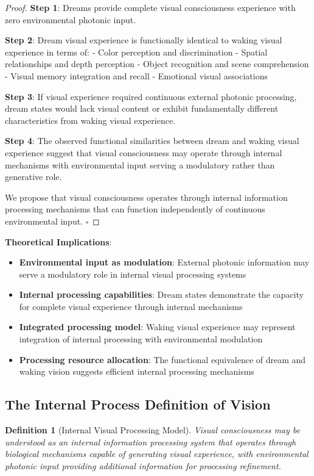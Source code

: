 \documentclass[12pt,a4paper]{article}
\newtheorem{definition}[theorem]{Definition}
\begin{document}
\begin{proof}
\textbf{Step 1}: Dreams provide complete visual consciousness experience with zero environmental photonic input.

\textbf{Step 2}: Dream visual experience is functionally identical to waking visual experience in terms of:
- Color perception and discrimination
- Spatial relationships and depth perception  
- Object recognition and scene comprehension
- Visual memory integration and recall
- Emotional visual associations

\textbf{Step 3}: If visual experience required continuous external photonic processing, dream states would lack visual content or exhibit fundamentally different characteristics from waking visual experience.

\textbf{Step 4}: The observed functional similarities between dream and waking visual experience suggest that visual consciousness may operate through internal mechanisms with environmental input serving a modulatory rather than generative role.

We propose that visual consciousness operates through internal information processing mechanisms that can function independently of continuous environmental input. $\square$
\end{proof}

\textbf{Theoretical Implications}:
\begin{itemize}
\item \textbf{Environmental input as modulation}: External photonic information may serve a modulatory role in internal visual processing systems
\item \textbf{Internal processing capabilities}: Dream states demonstrate the capacity for complete visual experience through internal mechanisms
\item \textbf{Integrated processing model}: Waking visual experience may represent integration of internal processing with environmental modulation
\item \textbf{Processing resource allocation}: The functional equivalence of dream and waking vision suggests efficient internal processing mechanisms
\end{itemize}

\subsection{The Internal Process Definition of Vision}

\begin{definition}[Internal Visual Processing Model]
Visual consciousness may be understood as an internal information processing system that operates through biological mechanisms capable of generating visual experience, with environmental photonic input providing additional information for processing refinement.
\end{definition}
\end{document}
